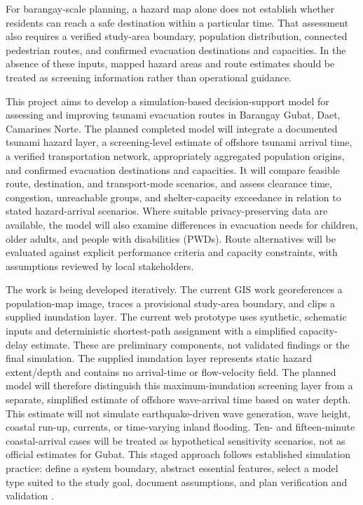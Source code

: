 \documentclass[conference]{IEEEtran}
\begin{document}
For barangay-scale planning, a hazard map alone does not establish whether residents can reach a safe destination within a particular time. That assessment also requires a verified study-area boundary, population distribution, connected pedestrian routes, and confirmed evacuation destinations and capacities. In the absence of these inputs, mapped hazard areas and route estimates should be treated as screening information rather than operational guidance.

This project aims to develop a simulation-based decision-support model for assessing and improving tsunami evacuation routes in Barangay Gubat, Daet, Camarines Norte. The planned completed model will integrate a documented tsunami hazard layer, a screening-level estimate of offshore tsunami arrival time, a verified transportation network, appropriately aggregated population origins, and confirmed evacuation destinations and capacities. It will compare feasible route, destination, and transport-mode scenarios, and assess clearance time, congestion, unreachable groups, and shelter-capacity exceedance in relation to stated hazard-arrival scenarios. Where suitable privacy-preserving data are available, the model will also examine differences in evacuation needs for children, older adults, and people with disabilities (PWDs). Route alternatives will be evaluated against explicit performance criteria and capacity constraints, with assumptions reviewed by local stakeholders.

The work is being developed iteratively. The current GIS work georeferences a population-map image, traces a provisional study-area boundary, and clips a supplied inundation layer. The current web prototype uses synthetic, schematic inputs and deterministic shortest-path assignment with a simplified capacity-delay estimate. These are preliminary components, not validated findings or the final simulation. The supplied inundation layer represents static hazard extent/depth and contains no arrival-time or flow-velocity field. The planned model will therefore distinguish this maximum-inundation screening layer from a separate, simplified estimate of offshore wave-arrival time based on water depth. This estimate will not simulate earthquake-driven wave generation, wave height, coastal run-up, currents, or time-varying inland flooding. Ten- and fifteen-minute coastal-arrival cases will be treated as hypothetical sensitivity scenarios, not as official estimates for Gubat. This staged approach follows established simulation practice: define a system boundary, abstract essential features, select a model type suited to the study goal, document assumptions, and plan verification and validation \cite{sadeghi,sargent,noaaprop}.
\end{document}
